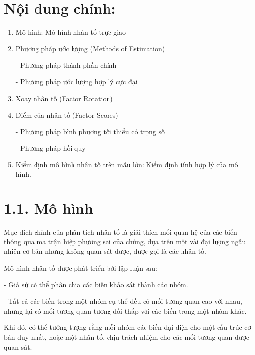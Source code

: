 \documentclass{article}
\begin{document}
\section * {Nội dung chính:}

%
%


\begin{enumerate}
	\Large \item  {Mô hình: Mô hình nhân tố trực giao}
	
	\Large \item {Phương pháp ước lượng (Methods of Estimation)}

		- Phương pháp thành phần chính
	
		- Phương pháp ước lượng hợp lý cực đại
	
	\Large \item Xoay nhân tố (Factor Rotation)
		
	\Large \item {Điểm của nhân tố (Factor Scores)}
	
		- Phương pháp bình phương tối thiểu có trọng số
	
		- Phương pháp hồi quy
	
	\Large \item {Kiểm định} mô hình nhân tố trên mẫu lớn: Kiểm định tính hợp lý của mô hình.
	
\end{enumerate}

\section* {1.1. Mô hình}
\vspace{0.3cm}

Mục đích chính của phân tích nhân tố là giải thích mối quan hệ của các biến thông qua ma trận hiệp phương sai của chúng, dựa trên một vài đại lượng ngẫu nhiên cơ bản nhưng không quan sát được, được gọi là các nhân tố.

Mô hình nhân tố được phát triển bởi lập luận sau:

	- Giả sử có thể phân chia các biến khảo sát thành các nhóm.
	
	- Tất cả các biến trong một nhóm cụ thể đều có mối tương quan cao với nhau, nhưng lại có mối tương quan tương đối thấp với các biến trong một nhóm khác.
	
Khi đó, có thể tưởng tượng rằng mỗi nhóm các biến đại diện cho một cấu trúc cơ bản duy nhất, hoặc một nhân tố, chịu trách nhiệm cho các mối tương quan được quan sát.
\end{document}

